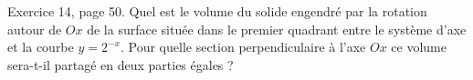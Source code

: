 \begin{exercice}\label{exo0026}

Exercice 14, page 50. Quel est le volume du solide engendré par la rotation autour de $Ox$ de la surface située dans le premier quadrant entre le système d'axe et la courbe $y=2^{-x}$. Pour quelle section perpendiculaire à l'axe $Ox$ ce volume sera-t-il partagé en deux parties égales ?

\end{exercice}
